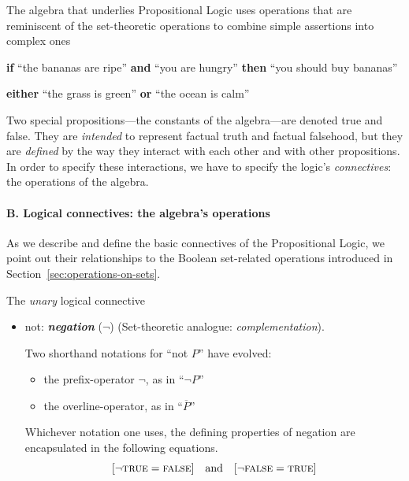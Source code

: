 \bigskip

The algebra that underlies Propositional Logic uses operations that are reminiscent of the set-theoretic operations to combine simple assertions into complex ones

\smallskip

{\bf if} ``the bananas are ripe'' {\bf and} ``you are hungry'' {\bf then} ``you should buy bananas''

\smallskip

{\bf either} ``the grass is green'' {\bf or} ``the ocean is calm''

\smallskip

\noindent
Two special propositions---the constants of the algebra---are denoted {\sc true} and {\sc false}.  They are {\em intended} to represent factual truth and factual falsehood, but they are {\em defined} by the way they interact with each other and with other propositions.  In order
to specify these interactions, we have to specify the logic's {\it connectives}: the operations of the algebra.


\paragraph{B. Logical connectives: the algebra's operations}

\noindent
As we describe and define the basic connectives of the Propositional Logic, we point out their relationships to the Boolean set-related operations introduced in Section~\ref{sec:operations-on-sets}.

\medskip

 {\small\sf The {\em unary} logical connective}
\begin{itemize}
\item
{\sc not}: {\bf\em negation} ($\neg$)
\hspace*{.1in}
{\small\sf (Set-theoretic analogue: {\em complementation})}.

\smallskip

Two shorthand notations for ``{\sc not} $P$'' have evolved:
  \begin{itemize}
  \item
the prefix-operator $\neg$, as in ``$\neg P$''
  \medskip\item
the overline-operator, as in ``$\overline{P}$''
  \end{itemize}
Whichever notation one uses, the defining properties of negation are encapsulated in the following equations.
\[
[\neg \mbox{\sc true} = \mbox{\sc false}] \ \ \mbox{ and } \ \
 [\neg \mbox{\sc false} = \mbox{\sc true}]
\]
\end{itemize}

